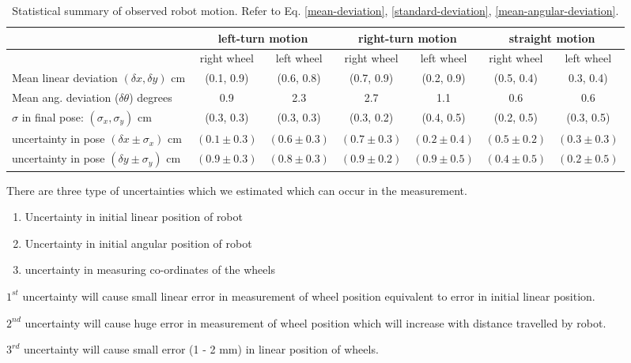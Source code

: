 \begin{table}[H]
	\centering
	\begin{tabular}{| l | c | c | c | c | c | c |}
		\hline
		& \multicolumn{2}{c|}{left-turn motion} & \multicolumn{2}{c|}{ right-turn motion} & \multicolumn{2}{c|}{straight motion} \\
		\hline
		& right wheel & left wheel & right wheel & left wheel & right wheel & left wheel \\
		\hline
		Mean linear deviation $(\delta x, \delta y)$ cm & (0.1, 0.9) & (0.6, 0.8)
		& (0.7, 0.9) & (0.2, 0.9) & (0.5, 0.4) & 0.3, 0.4) \\
		\hline
		Mean ang. deviation ($\delta \theta$) degrees & 0.9 & 2.3 & 2.7 & 1.1 & 0.6 & 0.6 \\
		\hline
		$\sigma$ in final pose: $(\sigma_x, \sigma_y)$ cm & (0.3, 0.3) & (0.3, 0.3) & (0.3, 0.2) & (0.4, 0.5) & (0.2, 0.5) & (0.3, 0.5)\\
		\hline
		uncertainty in pose $(\delta x \pm \sigma_x)$ cm & $(0.1 \pm 0.3)$ & $(0.6 \pm 0.3)$ & $(0.7 \pm 0.3)$ & $(0.2 \pm 0.4)$ & $(0.5 \pm 0.2)$ & $(0.3 \pm 0.3)$ \\
		uncertainty in pose $(\delta y \pm \sigma_y)$ cm & $(0.9 \pm 0.3)$ & $(0.8 \pm 0.3)$ & $(0.9 \pm 0.2)$ & $(0.9 \pm 0.5)$ & $(0.4 \pm 0.5)$ & $(0.2 \pm 0.5)$ \\
		\hline
	\end{tabular}
	\caption{Statistical summary of observed robot motion. Refer to Eq. \ref{mean-deviation}, \ref{standard-deviation}, \ref{mean-angular-deviation}.}
	\label{stats}
\end{table}
There are three type of uncertainties which we estimated which can occur in the measurement. 
\begin{enumerate}
	\item Uncertainty in initial linear position of robot
	\item Uncertainty in initial angular position of robot
	\item uncertainty in measuring co-ordinates of the wheels
\end{enumerate}   

$1^{st}$ uncertainty will cause small linear error in measurement of wheel position equivalent to error in initial linear position.

$2^{nd}$ uncertainty will cause huge error in measurement of wheel position which will increase with distance travelled by robot. 

$3^{rd}$ uncertainty will cause small error (1 - 2 mm) in linear position of wheels.

